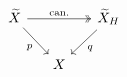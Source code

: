 \documentclass{article}
\begin{document}
    \begin{equation*}
        \begin{tikzcd}[column sep = 0.5cm]
            \widetilde{X} \ar[rr, "\textrm{can.}", twoheadrightarrow] \ar[dr, "p"'] & & \widetilde{X}_H \ar[dl, "q"] \\
            & X
        \end{tikzcd}
    \end{equation*}
\end{document}
